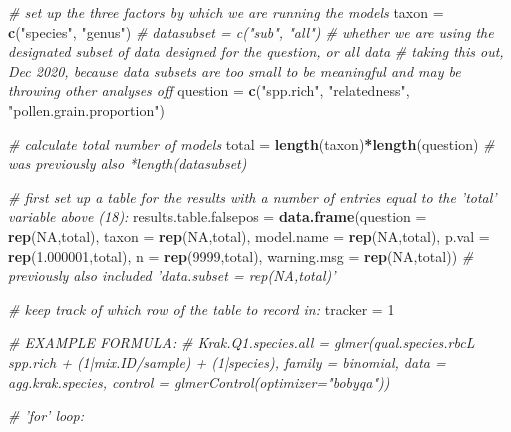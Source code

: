 \documentclass[
]{article}
\newenvironment{Shaded}{\begin{snugshade}}{\end{snugshade}}
\newcommand{\CommentTok}[1]{\textcolor[rgb]{0.56,0.35,0.01}{\textit{#1}}}
\newcommand{\DataTypeTok}[1]{\textcolor[rgb]{0.13,0.29,0.53}{#1}}
\newcommand{\DecValTok}[1]{\textcolor[rgb]{0.00,0.00,0.81}{#1}}
\newcommand{\FloatTok}[1]{\textcolor[rgb]{0.00,0.00,0.81}{#1}}
\newcommand{\KeywordTok}[1]{\textcolor[rgb]{0.13,0.29,0.53}{\textbf{#1}}}
\newcommand{\NormalTok}[1]{#1}
\newcommand{\OperatorTok}[1]{\textcolor[rgb]{0.81,0.36,0.00}{\textbf{#1}}}
\newcommand{\OtherTok}[1]{\textcolor[rgb]{0.56,0.35,0.01}{#1}}
\newcommand{\StringTok}[1]{\textcolor[rgb]{0.31,0.60,0.02}{#1}}
\begin{document}
\begin{Shaded}
\begin{Highlighting}[]
\CommentTok{# set up the three factors by which we are running the models}
\NormalTok{taxon =}\StringTok{ }\KeywordTok{c}\NormalTok{(}\StringTok{"species"}\NormalTok{, }\StringTok{"genus"}\NormalTok{)}
\CommentTok{# datasubset = c("sub", "all") # whether we are using the designated subset of data designed for the question, or all data}
\CommentTok{# taking this out, Dec 2020, because data subsets are too small to be meaningful and may be throwing other analyses off}
\NormalTok{question =}\StringTok{ }\KeywordTok{c}\NormalTok{(}\StringTok{"spp.rich"}\NormalTok{, }\StringTok{"relatedness"}\NormalTok{, }\StringTok{"pollen.grain.proportion"}\NormalTok{)}

\CommentTok{# calculate total number of models}
\NormalTok{total =}\StringTok{ }\KeywordTok{length}\NormalTok{(taxon)}\OperatorTok{*}\KeywordTok{length}\NormalTok{(question) }\CommentTok{# was previously also *length(datasubset)}

\CommentTok{# first set up a table for the results with a number of entries equal to the 'total' variable above (18):}
\NormalTok{results.table.falsepos =}\StringTok{ }\KeywordTok{data.frame}\NormalTok{(}\DataTypeTok{question =} \KeywordTok{rep}\NormalTok{(}\OtherTok{NA}\NormalTok{,total), }\DataTypeTok{taxon  =} \KeywordTok{rep}\NormalTok{(}\OtherTok{NA}\NormalTok{,total), }\DataTypeTok{model.name =} \KeywordTok{rep}\NormalTok{(}\OtherTok{NA}\NormalTok{,total), }\DataTypeTok{p.val  =} \KeywordTok{rep}\NormalTok{(}\FloatTok{1.000001}\NormalTok{,total), }\DataTypeTok{n  =} \KeywordTok{rep}\NormalTok{(}\DecValTok{9999}\NormalTok{,total), }\DataTypeTok{warning.msg =} \KeywordTok{rep}\NormalTok{(}\OtherTok{NA}\NormalTok{,total))}
\CommentTok{# previously also included 'data.subset  = rep(NA,total)'}

\CommentTok{# keep track of which row of the table to record in:}
\NormalTok{tracker =}\StringTok{ }\DecValTok{1}

\CommentTok{# EXAMPLE FORMULA:}
\CommentTok{# Krak.Q1.species.all = glmer(qual.species.rbcL ~ spp.rich + (1|mix.ID/sample) + (1|species), family = binomial, data = agg.krak.species, control = glmerControl(optimizer="bobyqa"))}

\CommentTok{# 'for' loop:}


\end{Highlighting}
\end{Shaded}
\end{document}
